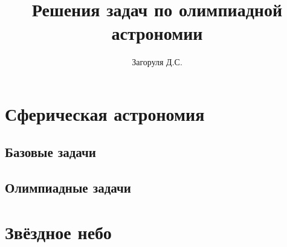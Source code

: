 \documentclass[a4paper, 12pt]{article}
\title{\textbf{Решения задач по олимпиадной астрономии}}
\begin{document}
\author{Загоруля Д.С.}
\maketitle
\tableofcontents
\newpage
\section{Сферическая астрономия}
\subsection{Базовые задачи}

\subsection{Олимпиадные задачи}


\section{Звёздное небо}

\end{document}
